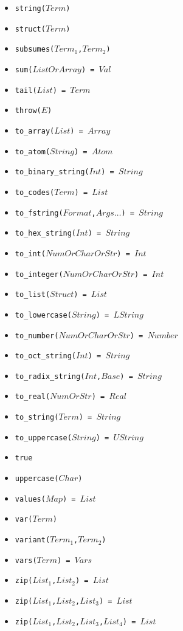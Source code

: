 \documentclass[10pt]{article}
\begin{document}
\begin{multicols}{2}
\begin{scriptsize}
\begin{itemize}
    \item \texttt{string($Term$)}
    \item \texttt{struct($Term$)}
    \item \texttt{subsumes($Term_1$,$Term_2$)}
    \item \texttt{sum($ListOrArray$) = $Val$}
    \item \texttt{tail($List$) = $Term$}
    \item \texttt{throw($E$)}
    \item \texttt{to\_array($List$) = $Array$}
    \item \texttt{to\_atom($String$) = $Atom$}
    \item \texttt{to\_binary\_string($Int$) = $String$}
    \item \texttt{to\_codes($Term$) = $List$}
    \item \texttt{to\_fstring($Format$,$Args\ldots$) = $String$}
    \item \texttt{to\_hex\_string($Int$) = $String$}
    \item \texttt{to\_int($NumOrCharOrStr$) = $Int$}
    \item \texttt{to\_integer($NumOrCharOrStr$) = $Int$}
    \item \texttt{to\_list($Struct$) = $List$}
    \item \texttt{to\_lowercase($String$) = $LString$}
    \item \texttt{to\_number($NumOrCharOrStr$) = $Number$}
    \item \texttt{to\_oct\_string($Int$) = $String$}
    \item \texttt{to\_radix\_string($Int$,$Base$) = $String$}
    \item \texttt{to\_real($NumOrStr$) = $Real$}
    \item \texttt{to\_string($Term$) = $String$}
    \item \texttt{to\_uppercase($String$) = $UString$}
    \item \texttt{true}
    \item \texttt{uppercase($Char$)}
    \item \texttt{values($Map$) = $List$}
    \item \texttt{var($Term$)}
    \item \texttt{variant($Term_1$,$Term_2$)}
    \item \texttt{vars($Term$) = $Vars$}
    \item \texttt{zip($List_1$,$List_2$) = $List$}
    \item \texttt{zip($List_1$,$List_2$,$List_3$) = $List$}
    \item \texttt{zip($List_1$,$List_2$,$List_3$,$List_4$) = $List$}
\end{itemize}
\end{scriptsize}
%

\end{multicols}
\end{document}
